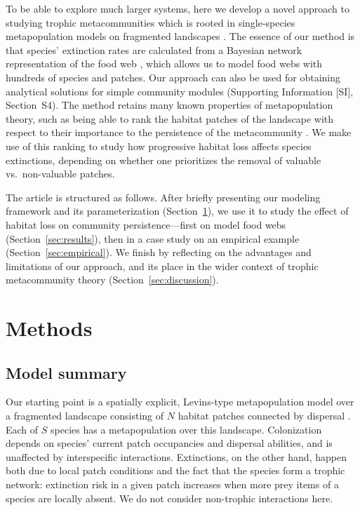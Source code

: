 \documentclass[11pt]{article}
\newcommand{\SI}{SI}
\begin{document}
To be able to explore much larger systems, here we develop a novel approach to studying trophic metacommunities which is rooted in single-species metapopulation models on fragmented landscapes \citep{HanskiOvaskainen2000, OvaskainenHanski2001, HanskiOvaskainen2003, Grillietal2015}. The essence of our method is that species' extinction rates are calculated from a Bayesian network representation of the food web \citep{Eklofetal2013MEE}, which allows us to model food webs with hundreds of species and patches. Our approach can also be used for obtaining analytical solutions for simple community modules (Supporting Information [\SI], Section~S4). The method retains many known properties of metapopulation theory, such as being able to rank the habitat patches of the landscape with respect to their importance to the persistence of the metacommunity \citep{OvaskainenHanski2001}. We make use of this ranking to study how progressive habitat loss affects species extinctions, depending on whether one prioritizes the removal of valuable vs.\ non-valuable patches.

The article is structured as follows. After briefly presenting our modeling framework and its parameterization (Section~\ref{sec:methods}), we use it to study the effect of habitat loss on community persistence---first on model food webs (Section~\ref{sec:results}), then in a case study on an empirical example (Section~\ref{sec:empirical}). We finish by reflecting on the advantages and limitations of our approach, and its place in the wider context of trophic metacommunity theory (Section~\ref{sec:discussion}).


\section{Methods} \label{sec:methods}

\subsection{Model summary} \label{sec:model}

Our starting point is a spatially explicit, Levins-type metapopulation model over a fragmented landscape consisting of $N$ habitat patches connected by dispersal \citep{HanskiOvaskainen2000, HanskiOvaskainen2003, OvaskainenHanski2001, Grillietal2015}. Each of $S$ species has a metapopulation over this landscape. Colonization depends on species' current patch occupancies and dispersal abilities, and is unaffected by interspecific interactions. Extinctions, on the other hand, happen both due to local patch conditions and the fact that the species form a trophic network: extinction risk in a given patch increases when more prey items of a species are locally absent. We do not consider non-trophic interactions here.
\end{document}
